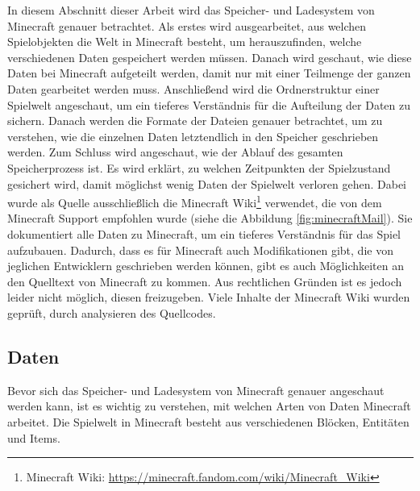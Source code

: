 In diesem Abschnitt dieser Arbeit wird das Speicher- und Ladesystem von Minecraft genauer betrachtet. Als erstes wird ausgearbeitet, aus welchen Spielobjekten die Welt in Minecraft besteht, um herauszufinden, welche verschiedenen Daten gespeichert werden müssen. Danach wird geschaut, wie diese Daten bei Minecraft aufgeteilt werden, damit nur mit einer Teilmenge der ganzen Daten gearbeitet werden muss. Anschließend wird die Ordnerstruktur einer Spielwelt angeschaut, um ein tieferes Verständnis für die Aufteilung der Daten zu sichern. Danach werden die Formate der Dateien genauer betrachtet, um zu verstehen, wie die einzelnen Daten letztendlich in den Speicher geschrieben werden. Zum Schluss wird angeschaut, wie der Ablauf des gesamten Speicherprozess ist. Es wird erklärt, zu welchen Zeitpunkten der Spielzustand gesichert wird, damit möglichst wenig Daten der Spielwelt verloren gehen. Dabei wurde als Quelle ausschließlich die Minecraft Wiki\footnote{ Minecraft Wiki: \url{https://minecraft.fandom.com/wiki/Minecraft_Wiki}} verwendet, die von dem Minecraft Support empfohlen wurde (siehe die Abbildung \ref{fig:minecraftMail}). Sie dokumentiert alle Daten zu Minecraft, um ein tieferes Verständnis für das Spiel aufzubauen. Dadurch, dass es für Minecraft auch Modifikationen gibt, die von jeglichen Entwicklern geschrieben werden können, gibt es auch Möglichkeiten an den Quelltext von Minecraft zu kommen. Aus rechtlichen Gründen ist es jedoch leider nicht möglich, diesen freizugeben. Viele Inhalte der Minecraft Wiki wurden geprüft, durch analysieren des Quellcodes.



\subsection{Daten}
Bevor sich das Speicher- und Ladesystem von Minecraft genauer angeschaut werden kann, ist es wichtig zu verstehen, mit welchen Arten von Daten Minecraft arbeitet. Die Spielwelt in Minecraft besteht aus verschiedenen Blöcken, Entitäten und Items. 

